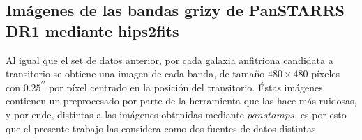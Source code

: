 \documentclass[../tesis.tex]{subfiles}
\begin{document}
\subsection{Imágenes de las bandas grizy de PanSTARRS DR1 mediante hips2fits}\label{methods:dataset2}
Al igual que el set de datos anterior, por cada galaxia anfitriona candidata  a transitorio se obtiene una imagen de cada banda, de tamaño $480\times480$ píxeles con $0.25^{\prime\prime}$ por píxel centrado en la posición del transitorio. Éstas imágenes contienen un preprocesado por parte de la herramienta que las hace más ruidosas, y por ende, distintas a las imágenes obtenidas mediante $panstamps$, es por esto que el presente trabajo las considera como dos fuentes de datos distintas.\par\null\par
\end{document}
